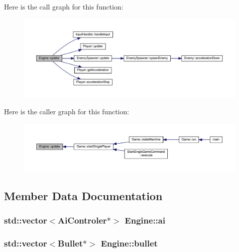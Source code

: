 Here is the call graph for this function\+:
\nopagebreak
\begin{figure}[H]
\begin{center}
\leavevmode
\includegraphics[width=350pt]{class_engine_ad2ff110d5a86c1cd60b541d65915ac48_cgraph}
\end{center}
\end{figure}




Here is the caller graph for this function\+:
\nopagebreak
\begin{figure}[H]
\begin{center}
\leavevmode
\includegraphics[width=350pt]{class_engine_ad2ff110d5a86c1cd60b541d65915ac48_icgraph}
\end{center}
\end{figure}




\subsection{Member Data Documentation}
\hypertarget{class_engine_a82c1ca4ee6f6dd4e9b79918aa12c156f}{}
\subsubsection[{ai}]{\setlength{\rightskip}{0pt plus 5cm}std\+::vector$<${\bf Ai\+Controler}$\ast$$>$ Engine\+::ai}\label{class_engine_a82c1ca4ee6f6dd4e9b79918aa12c156f}
\hypertarget{class_engine_a267b13093cb4ea1de9c297a96b0314ea}{}
\subsubsection[{bullet}]{\setlength{\rightskip}{0pt plus 5cm}std\+::vector$<${\bf Bullet}$\ast$$>$ Engine\+::bullet}\label{class_engine_a267b13093cb4ea1de9c297a96b0314ea}
\hypertarget{class_engine_a9c359f201d47e7fb35b9c379808d4263}{}
